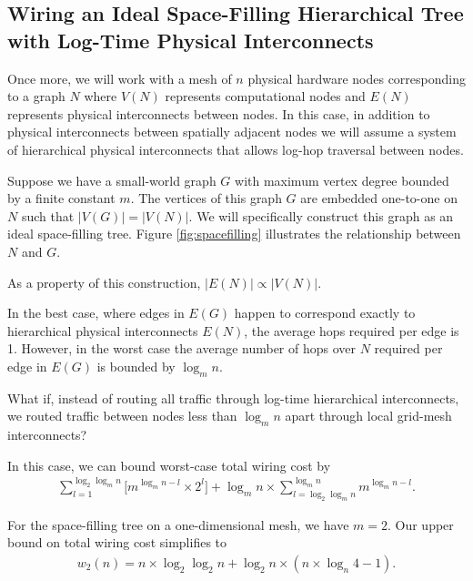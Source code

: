 \subsection{Wiring an Ideal Space-Filling Hierarchical Tree with Log-Time Physical Interconnects} \label{sec:proof3}

Once more, we will work with a mesh of $n$ physical hardware nodes corresponding to a graph $N$ where $V(N)$ represents computational nodes and $E(N)$ represents physical interconnects between nodes.
In this case, in addition to physical interconnects between spatially adjacent nodes we will assume a system of hierarchical physical interconnects that allows log-hop traversal between nodes.



Suppose we have a small-world graph $G$ with maximum vertex degree bounded by a finite constant $m$.
The vertices of this graph $G$ are embedded one-to-one on $N$ such that $|V(G)| = |V(N)|$.
We will specifically construct this graph as an ideal space-filling tree.
Figure \ref{fig:spacefilling} illustrates the relationship between $N$ and $G$.

As a property of this construction, $|E(N)| \propto |V(N)|$.

In the best case, where edges in $E(G)$ happen to correspond exactly to hierarchical physical interconnects $E(N)$, the average hops required per edge is 1.
However, in the worst case the average number of hops over $N$ required per edge in $E(G)$ is bounded by $\log_m n$.

What if, instead of routing all traffic through log-time hierarchical interconnects, we routed traffic between nodes less than $\log_m n$ apart through local grid-mesh interconnects?

In this case, we can bound worst-case total wiring cost by
\begin{align*}
\sum_{l = 1}^{\log_2 \log_m n} %
\Big[
  m^{\log_m n - l} %
  \times
  2^l %
\Big]
+
\log_m n %
\times
\sum_{l = \log_2 \log_m n }^{ \log_m n} %
m^{\log_m n - l}.
\end{align*}

For the space-filling tree on a one-dimensional mesh, we have $m = 2$.
Our upper bound on total wiring cost simplifies to
\begin{align*}
w_2(n) =
n \times \log_2 \log_2 n
+
\log_2 n \times (n \times \log_n 4 - 1).
\end{align*}


